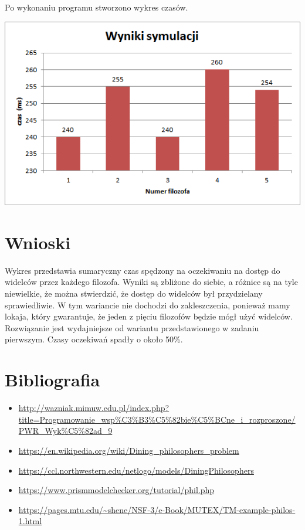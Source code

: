 \documentclass[12pt]{article}
\begin{document}
Po wykonaniu programu stworzono wykres czasów.
\begin{center}
\centering
    \includegraphics{philosophers_arbiter.png}
\end{center}


\section{Wnioski}
Wykres przedstawia sumaryczny czas spędzony na oczekiwaniu na dostęp do widelców przez każdego filozofa. Wyniki są zbliżone do siebie, a różnice są na tyle niewielkie, że można stwierdzić, że dostęp do widelców był przydzielany sprawiedliwie. W tym wariancie nie dochodzi do zakleszczenia, ponieważ mamy lokaja, który gwarantuje, że jeden z pięciu filozofów będzie mógł użyć widelców. Rozwiązanie jest wydajniejsze od wariantu przedstawionego w zadaniu pierwszym. Czasy oczekiwań spadły o około 50\%.

\newpage
\section{Bibliografia}
\begin{itemize}
    \item \url{http://wazniak.mimuw.edu.pl/index.php?title=Programowanie_wsp%C3%B3%C5%82bie%C5%BCne_i_rozproszone/PWR_Wyk%C5%82ad_9}
    \item \url{https://en.wikipedia.org/wiki/Dining_philosophers_problem}
    \item \url{https://ccl.northwestern.edu/netlogo/models/DiningPhilosophers}
    \item \url{https://www.prismmodelchecker.org/tutorial/phil.php}
    \item \url{https://pages.mtu.edu/~shene/NSF-3/e-Book/MUTEX/TM-example-philos-1.html}

\end{itemize}
\end{document}
